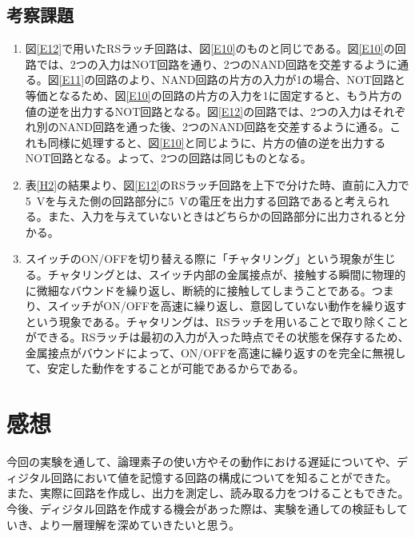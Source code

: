 \documentclass[uplatex, a4j, dvipdfmx]{jsarticle}
\begin{document}
\subsection{考察課題}
\begin{enumerate}[label=(\arabic*), itemsep=1.5ex, leftmargin=2.5em]
    \item 図\ref{E12}で用いたRSラッチ回路は、図\ref{E10}のものと同じである。図\ref{E10}の回路では、2つの入力はNOT回路を通り、2つのNAND回路を交差するように通る。図\ref{E11}の回路のより、NAND回路の片方の入力が1の場合、NOT回路と等価となるため、図\ref{E10}の回路の片方の入力を1に固定すると、もう片方の値の逆を出力するNOT回路となる。図\ref{E12}の回路では、2つの入力はそれぞれ別のNAND回路を通った後、2つのNAND回路を交差するように通る。これも同様に処理すると、図\ref{E10}と同じように、片方の値の逆を出力するNOT回路となる。よって、2つの回路は同じものとなる。

    \item 表\ref{H2}の結果より、図\ref{E12}のRSラッチ回路を上下で分けた時、直前に入力で\SI{5}{\volt}を与えた側の回路部分に\SI{5}{\volt}の電圧を出力する回路であると考えられる。また、入力を与えていないときはどちらかの回路部分に出力されると分かる。
    
    \item スイッチのON/OFFを切り替える際に「チャタリング」という現象が生じる。チャタリングとは、スイッチ内部の金属接点が、接触する瞬間に物理的に微細なバウンドを繰り返し、断続的に接触してしまうことである。つまり、スイッチがON/OFFを高速に繰り返し、意図していない動作を繰り返すという現象である。チャタリングは、RSラッチを用いることで取り除くことができる。RSラッチは最初の入力が入った時点でその状態を保存するため、金属接点がバウンドによって、ON/OFFを高速に繰り返すのを完全に無視して、安定した動作をすることが可能であるからである。
\end{enumerate}

\section{感想}
今回の実験を通して、論理素子の使い方やその動作における遅延についてや、ディジタル回路において値を記憶する回路の構成についてを知ることができた。
また、実際に回路を作成し、出力を測定し、読み取る力をつけることもできた。
今後、ディジタル回路を作成する機会があった際は、実験を通しての検証もしていき、より一層理解を深めていきたいと思う。
\end{document}
